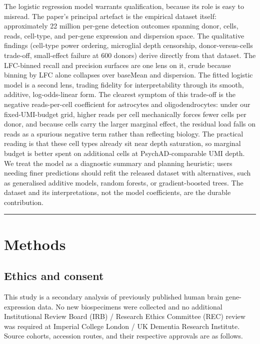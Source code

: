\documentclass[
]{article}
\begin{document}
The logistic regression model warrants qualification, because its role
is easy to misread. The paper's principal artefact is the empirical
dataset itself: approximately 22 million per-gene detection outcomes
spanning donor, cells, reads, cell-type, and per-gene expression and
dispersion space. The qualitative findings (cell-type power ordering,
microglial depth censorship, donor-versus-cells trade-off, small-effect
failure at 600 donors) derive directly from that dataset. The LFC-binned
recall and precision surfaces are one lens on it, crude because binning
by \textbar LFC\textbar{} alone collapses over baseMean and dispersion.
The fitted logistic model is a second lens, trading fidelity for
interpretability through its smooth, additive, log-odds-linear form. The
clearest symptom of this trade-off is the negative reads-per-cell
coefficient for astrocytes and oligodendrocytes: under our
fixed-UMI-budget grid, higher reads per cell mechanically forces fewer
cells per donor, and because cells carry the larger marginal effect, the
residual load falls on reads as a spurious negative term rather than
reflecting biology. The practical reading is that these cell types
already sit near depth saturation, so marginal budget is better spent on
additional cells at PsychAD-comparable UMI depth. We treat the model as
a diagnostic summary and planning heuristic; users needing finer
predictions should refit the released dataset with alternatives, such as
generalised additive models, random forests, or gradient-boosted trees.
The dataset and its interpretations, not the model coefficients, are the
durable contribution.

\begin{center}\rule{0.5\linewidth}{0.5pt}\end{center}

\section{Methods}\label{methods}

\subsection{Ethics and consent}\label{ethics-and-consent}

This study is a secondary analysis of previously published human brain
gene-expression data. No new biospecimens were collected and no
additional Institutional Review Board (IRB) / Research Ethics Committee
(REC) review was required at Imperial College London / UK Dementia
Research Institute. Source cohorts, accession routes, and their
respective approvals are as follows.
\end{document}
